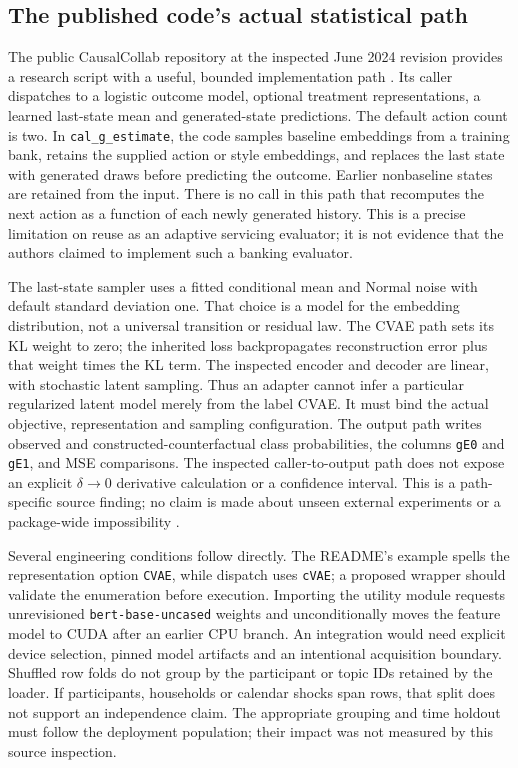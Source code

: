\subsection{The published code's actual statistical path}

The public CausalCollab repository at the inspected June 2024 revision
provides a research script with a useful, bounded implementation path
\citep{exec16_longpolicy_code}. Its caller dispatches to a logistic outcome
model, optional treatment representations, a learned last-state mean and
generated-state predictions. The default action count is two.
In \texttt{cal\_g\_estimate}, the code samples baseline embeddings from a
training bank, retains the supplied action or style embeddings, and
replaces the last state with generated draws before predicting the
outcome. Earlier nonbaseline states are retained from the input.
There is no call in this path that recomputes the next action as a function
of each newly generated history. This is a precise limitation on reuse
as an adaptive servicing evaluator; it is not evidence that the authors
claimed to implement such a banking evaluator.

The last-state sampler uses a fitted conditional mean and Normal noise
with default standard deviation one. That choice is a model for the
embedding distribution, not a universal transition or residual law.
The CVAE path sets its KL weight to zero; the inherited loss
backpropagates reconstruction error plus that weight times the KL term.
The inspected encoder and decoder are linear, with stochastic latent
sampling. Thus an adapter cannot infer a particular regularized latent
model merely from the label CVAE. It must bind the actual objective,
representation and sampling configuration.
The output path writes observed and constructed-counterfactual class
probabilities, the columns \texttt{gE0} and \texttt{gE1}, and MSE
comparisons. The inspected caller-to-output path does not expose an
explicit $\delta\to0$ derivative calculation or a confidence interval.
This is a path-specific source finding; no claim is made about unseen
external experiments or a package-wide impossibility
\citep{exec16_longpolicy_code}.

Several engineering conditions follow directly. The README's example
spells the representation option \texttt{CVAE}, while dispatch uses
\texttt{cVAE}; a proposed wrapper should validate the enumeration before
execution. Importing the utility module requests unrevisioned
\texttt{bert-base-uncased} weights and unconditionally moves the feature
model to CUDA after an earlier CPU branch.
An integration would need explicit device selection, pinned model
artifacts and an intentional acquisition boundary.
Shuffled row folds do not group by the participant or topic IDs retained
by the loader. If participants, households or calendar shocks span rows,
that split does not support an independence claim.
The appropriate grouping and time holdout must follow the deployment
population; their impact was not measured by this source inspection.

